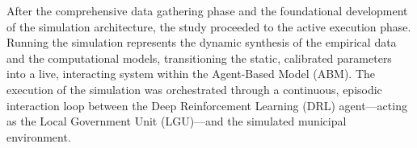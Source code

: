 After the comprehensive data gathering phase and the foundational development of the simulation architecture, the study proceeded to the active execution phase. Running the simulation represents the dynamic synthesis of the empirical data and the computational models, transitioning the static, calibrated parameters into a live, interacting system within the Agent-Based Model (ABM). The execution of the simulation was orchestrated through a continuous, episodic interaction loop between the Deep Reinforcement Learning (DRL) agent—acting as the Local Government Unit (LGU)—and the simulated municipal environment.








